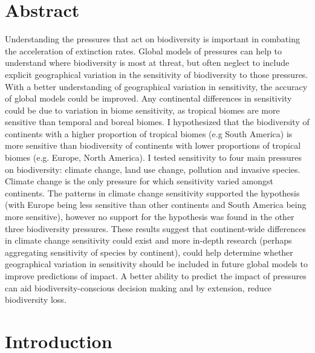 \documentclass[11pt, a4paper, titlepage]{article}
\begin{document}
	\newpage
	
	\section*{Abstract}
	 Understanding the pressures that act on biodiversity is important in combating the acceleration of extinction rates. Global models of pressures can help to understand where biodiversity is most at threat, but often neglect to include explicit geographical variation in the sensitivity of biodiversity to those pressures. With a better understanding of geographical variation in sensitivity, the accuracy of global models could be improved. Any continental differences in sensitivity could be due to variation in biome sensitivity, as tropical biomes are more sensitive than temporal and boreal biomes. I hypothesized that the biodiversity of continents with a higher proportion of tropical biomes (e.g South America) is more sensitive than biodiversity of continents with lower proportions of tropical biomes (e.g. Europe, North America). I tested sensitivity to four main pressures on biodiversity: climate change, land use change, pollution and invasive species. Climate change is the only pressure for which sensitivity varied amongst continents. The patterns in climate change sensitivity supported the hypothesis (with Europe being less sensitive than other continents and South America being more sensitive), however no support for the hypothesis was found in the other three biodiversity pressures. These results suggest that continent-wide differences in climate change sensitivity could exist and more in-depth research (perhaps aggregating sensitivity of species by continent), could help determine whether geographical variation in sensitivity should be included in future global models to improve predictions of impact. A better ability to predict the impact of pressures can aid biodiversity-conscious decision making and by extension, reduce biodiversity loss. %
	
\newpage
\tableofcontents
\newpage
	
    \section*{Introduction}
    	
\end{document}
